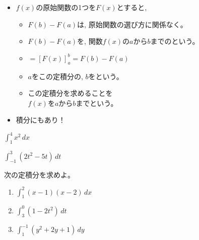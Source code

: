 \begin{multicols*}{4}
 \begin{itemize}
  \item $f(x)$の原始関数の1つを$F(x)$とすると,\\
	\begin{itemize}
	 \item $F(b)-F(a)$は, 原始関数の選び方に関係なく。
	 \item $F(b)-F(a)$を, 関数$f(x)$の$a$から$b$までのという。
	 \item {}$=\left[F(x)\right]_{a}^{b} = F(b)-F(a)$
	 \item $a$をこの定積分の, $b$をという。
	 \item この定積分を求めることを\\
	       \hspace{3\zw}$f(x)$を$a$から$b$までという。
	\end{itemize}
  \item 積分にもあり！
 \end{itemize}
 \vspace{1\zw}
 
 $\displaystyle\int_{1}^{4}x^2\,dx$
 \vfill
 \vfill
 \vfill
 \null
 
 \columnbreak{}
 
 \vspace{1\zw}
 
 \vspace{1\zw}
 
 $\displaystyle\int_{-1}^{3}(2t^2-5t)\,dt$
 \vfill
 \vfill
 \null
 
 \columnbreak{}
 
 次の定積分を求めよ。
 \begin{enumerate}
  \item $\displaystyle\int_{1}^{2}(x-1)(x-2)\,dx$
	\begin{ansBlockSize}{24}
	\end{ansBlockSize}
	\vfill
  \item $\displaystyle\int_{3}^{0}(1-2t^2)\,dt$
	\begin{ansBlockSize}{24}
	\end{ansBlockSize}
	\vfill
  \item $\displaystyle\int_{1}^{-1}(y^2+2y+1)\,dy$
	\begin{ansBlockSize}{24}
	\end{ansBlockSize}
 \end{enumerate}
 

\end{multicols*}
